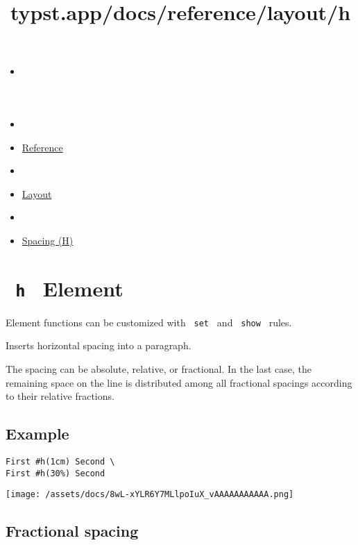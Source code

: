 \title{typst.app/docs/reference/layout/h}

\begin{itemize}
\tightlist
\item
  \href{/docs}{}
\item
  
\item
  \href{/docs/reference/}{Reference}
\item
  
\item
  \href{/docs/reference/layout/}{Layout}
\item
  
\item
  \href{/docs/reference/layout/h/}{Spacing (H)}
\end{itemize}

\section{\texorpdfstring{\texttt{\ h\ } {{ Element
}}}{ h   Element }}\label{summary}

\label{element-tooltip}
Element functions can be customized with \texttt{\ set\ } and
\texttt{\ show\ } rules.

Inserts horizontal spacing into a paragraph.

The spacing can be absolute, relative, or fractional. In the last case,
the remaining space on the line is distributed among all fractional
spacings according to their relative fractions.

\subsection{Example}\label{example}

\begin{verbatim}
First #h(1cm) Second \
First #h(30%) Second
\end{verbatim}

\texttt{[image: /assets/docs/8wL-xYLR6Y7MLlpoIuX\_vAAAAAAAAAAA.png]}

\subsection{Fractional spacing}\label{fractional-spacing}


